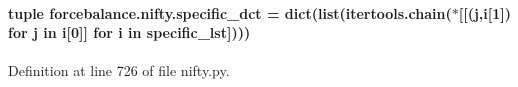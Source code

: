 \hypertarget{namespaceforcebalance_1_1nifty_ab652c941890b0f378100433699c8d255}{
\paragraph[{specific\-\_\-dct}]{\setlength{\rightskip}{0pt plus 5cm}tuple forcebalance.\-nifty.\-specific\-\_\-dct = dict(list(itertools.\-chain($\ast$\mbox{[}\mbox{[}(j,i\mbox{[}1\mbox{]}) for j in i\mbox{[}0\mbox{]}\mbox{]} for i in {\bf specific\-\_\-lst}\mbox{]})))}}\label{namespaceforcebalance_1_1nifty_ab652c941890b0f378100433699c8d255}


Definition at line 726 of file nifty.\-py.

